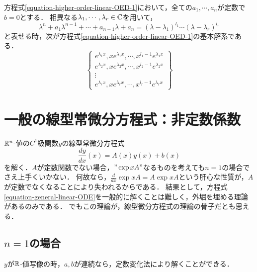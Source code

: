 \documentclass[uplatex,dvipdfmx]{jsreport}
\begin{document}
\begin{theorem}[定数係数斉次線型微分方程式系の場合]
    方程式\ref{equation-higher-order-linear-OED-1}において，全ての$a_1,\cdots,a_n$が定数で$b=0$とする．
    相異なる$\lambda_1,\cdots,\lambda_r\in\mathbb{C}$を用いて，
    \[ \lambda^n+a_1\lambda^{n-1}+\cdots+a_{n-1}\lambda+a_{n}=(\lambda-\lambda_1)^{l_1}\cdots(\lambda-\lambda_r)^{l_r} \]
    と表せる時，次が方程式\ref{equation-higher-order-linear-OED-1}の基本解系である．
    \[ \left\{ \begin{array}{c}
        e^{\lambda_1x},xe^{\lambda_1x},\cdots,x^{l_1-1}e^{\lambda_1x}\\
        e^{\lambda_2x},xe^{\lambda_2x},\cdots,x^{l_2-1}e^{\lambda_2x}\\
        \vdots\\
        e^{\lambda_rx},xe^{\lambda_rx},\cdots,x^{l_r-1}e^{\lambda_rx}
    \end{array} \right\} \]
\end{theorem}

\section{一般の線型常微分方程式：非定数係数}
$\mathbb{R}^n$-値の$C^1$級関数$y$の線型常微分方程式
\begin{equation}\label{equation-general-linear-ODE}
    \frac{dy}{dx}(x) = A(x)y(x)+b(x)
\end{equation}
を解く．$A$が定数関数でない場合，$"\exp xA"$なるものを考えても$n=1$の場合でさえ上手くいかない．
何故なら，$\frac{d}{dx}\exp xA=A\exp xA$という肝心な性質が，$A$が定数でなくなることにより失われるからである．
結果として，方程式\ref{equation-general-linear-ODE}を一般的に解くことは難しく，外堀を埋める理論があるのみである．
でもこの理論が，線型微分方程式の理論の骨子だとも思える．

\begin{example}
    
\end{example}

\subsection{$n=1$の場合}
$y$が$\mathbb{R}$-値写像の時，$a,b$が連続なら，定数変化法により解くことができる．
\end{document}
